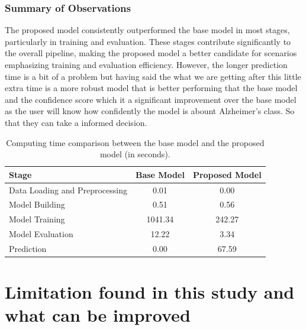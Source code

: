 \documentclass[12pt,onecolumn]{report}
\begin{document}
\subsection{Summary of Observations}
The proposed model consistently outperformed the base model in most stages, particularly in training and evaluation. These stages contribute significantly to the overall pipeline, making the proposed model a better candidate for scenarios emphasizing training and evaluation efficiency. However, the longer prediction time is a bit of a problem but having said the what we are getting after this little extra time is a more robust model that is better performing that the base model and the confidence score which it a significant improvement over the base model as the user will know how confidently the model is abount Alzheimer’s class. So that they can take a informed decision.

\begin{table}[h!]
    \centering
    \caption{Computing time comparison between the base model and the proposed model (in seconds).}
    \label{tab:timing-results}
    \begin{tabular}{|l|c|c|}
        \hline
        \textbf{Stage} & \textbf{Base Model} & \textbf{Proposed Model} \\
        \hline
        Data Loading and Preprocessing & 0.01 & 0.00 \\
        Model Building & 0.51 & 0.56 \\
        Model Training & 1041.34 & 242.27 \\
        Model Evaluation & 12.22 & 3.34 \\
        Prediction & 0.00 & 67.59 \\
        \hline
    \end{tabular}
\end{table}

\chapter{Limitation found in this study and what can be improved}
\end{document}

